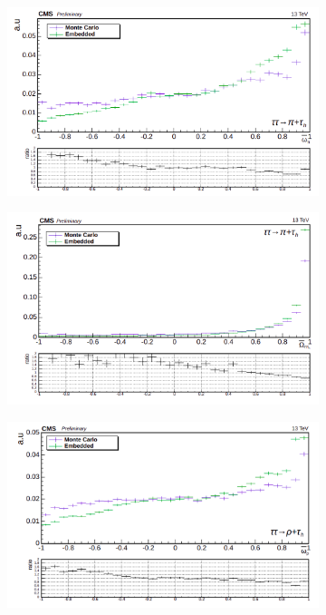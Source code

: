 \begin{figure}
    \begin{subfigure}[b]{0.5\linewidth}
    \centering
    \includegraphics[width=\linewidth]{Chapitre6/Images/OptVar/omegabar_pi_pitauh.png} 
    \caption*{} 
    \vspace{10mm}
  \end{subfigure}%
  \begin{subfigure}[b]{0.5\linewidth}
    \centering
    \includegraphics[width=\linewidth]{Chapitre6/Images/OptVar/Omegabar_pitauh.png} 
    \caption*{} 
    \vspace{10mm}
  \end{subfigure}
    \begin{subfigure}[b]{0.5\linewidth}
    \centering
    \includegraphics[width=\linewidth]{Chapitre6/Images/OptVar/omegabar_rho_rhotauh.png} 

\end{subfigure}
\end{figure}
